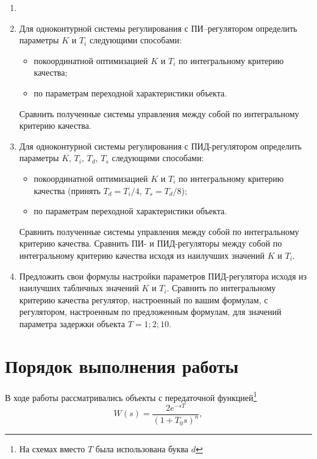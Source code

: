\begin{tasks}
	\begin{enumerate}
		\item[]
		
		\item Для одноконтурной системы регулирования с ПИ–регулятором определить параметры $K$ и $T_i$ следующими способами:
		\begin{itemize}
			\item покоординатной оптимизацией $K$ и $T_i$ по интегральному критерию качества;
			
			\item по параметрам переходной характеристики объекта.			
		\end{itemize}
		Сравнить полученные системы управления между собой по интегральному критерию качества.
		
		\item Для одноконтурной системы регулирования с ПИД-регулятором определить параметры $K$, $T_i$, $T_d$, $T_s$ следующими способами:
		\begin{itemize}
			\item покоординатной оптимизацией $K$ и $T_i$ по интегральному критерию качества (принять $T_d = T_i / 4$, $T_s = T_d / 8$);
			
			\item по параметрам переходной характеристики объекта.
		\end{itemize}
		Сравнить полученные системы управления между собой по интегральному критерию качества. Сравнить ПИ- и ПИД-регуляторы между собой по интегральному критерию качества исходя из наилучших значений $K$ и $T_i$.
		
		\item Предложить свои формулы настройки параметров ПИД-регулятора исходя из наилучших табличных значений $K$ и $T_i$. Сравнить по интегральному критерию качества регулятор, настроенный по вашим формулам, с регулятором, настроенным по предложенным формулам, для значений параметра задержки объекта $T = 1; 2; 10$.
	\end{enumerate}
\end{tasks}	

\newpage

\section{Порядок выполнения работы}
В ходе работы рассматривались объекты с передаточной функцией\footnote{На схемах вместо $T$ была использована буква $d$}
\[W(s) = \frac{2e^{-sT}}{(1 + T_0 s)^n},\]

